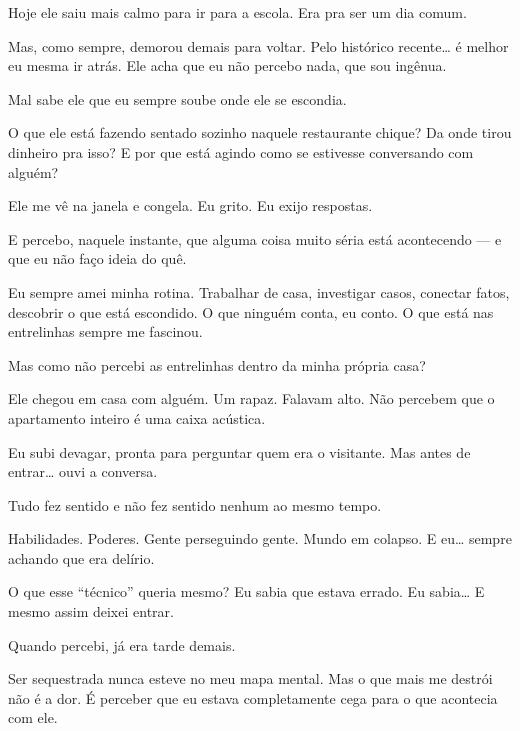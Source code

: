Hoje ele saiu mais calmo para ir para a escola.  
Era pra ser um dia comum.

Mas, como sempre, demorou demais para voltar.  
Pelo histórico recente… é melhor eu mesma ir atrás.  
Ele acha que eu não percebo nada, que sou ingênua.

Mal sabe ele que eu sempre soube onde ele se escondia.

\bigskip

O que ele está fazendo sentado sozinho naquele restaurante chique?  
Da onde tirou dinheiro pra isso?  
E por que está agindo como se estivesse conversando com alguém?

Ele me vê na janela e congela.  
Eu grito.  
Eu exijo respostas.  

E percebo, naquele instante, que alguma coisa muito séria está acontecendo — e que eu não faço ideia do quê.

\bigskip

Eu sempre amei minha rotina.  
Trabalhar de casa, investigar casos, conectar fatos, descobrir o que está escondido.  
O que ninguém conta, eu conto.  
O que está nas entrelinhas sempre me fascinou.

Mas como não percebi as entrelinhas dentro da minha própria casa?

\bigskip

Ele chegou em casa com alguém.  
Um rapaz.  
Falavam alto.  
Não percebem que o apartamento inteiro é uma caixa acústica.

Eu subi devagar, pronta para perguntar quem era o visitante.  
Mas antes de entrar… ouvi a conversa.

Tudo fez sentido e não fez sentido nenhum ao mesmo tempo.

Habilidades.  
Poderes.  
Gente perseguindo gente.  
Mundo em colapso.  
E eu… sempre achando que era delírio.

\bigskip

O que esse “técnico” queria mesmo?  
Eu sabia que estava errado.  
Eu sabia…  
E mesmo assim deixei entrar.

Quando percebi, já era tarde demais.

\bigskip

Ser sequestrada nunca esteve no meu mapa mental.  
Mas o que mais me destrói não é a dor.  
É perceber que eu estava completamente cega para o que acontecia com ele.


